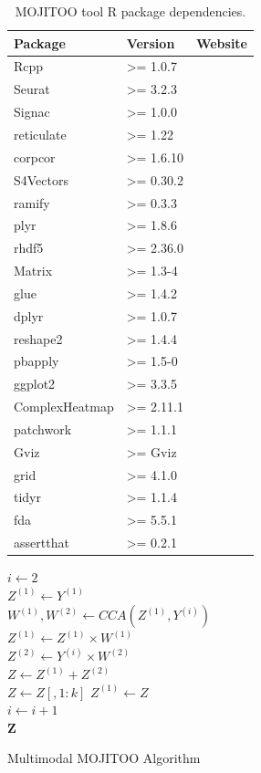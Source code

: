 \begin{table}[!ht]
	\centering
	\begin{tabular}{lll}
		\toprule
		\textbf{Package} & \textbf{Version} & \textbf{Website} \\
		\midrule
		  Rcpp  & >= 1.0.7& \url{} \\
		  Seurat & >= 3.2.3 & \url{} \\
		  Signac & >= 1.0.0& \url{} \\
		  reticulate & >= 1.22& \url{} \\
		  corpcor & >= 1.6.10 & \url{} \\
		  S4Vectors & >= 0.30.2 & \url{} \\
		  ramify & >= 0.3.3 & \url{} \\
		  plyr & >= 1.8.6 & \url{} \\
		  rhdf5 & >= 2.36.0 & \url{} \\
		  Matrix & >= 1.3-4 & \url{} \\
		  glue & >= 1.4.2 & \url{} \\
		  dplyr & >= 1.0.7 & \url{} \\
		  reshape2 & >= 1.4.4 & \url{} \\
		  pbapply & >= 1.5-0 & \url{} \\
		  ggplot2 & >= 3.3.5 & \url{} \\
		  ComplexHeatmap & >= 2.11.1 & \url{} \\
		  patchwork & >= 1.1.1 & \url{} \\
		  Gviz & >= Gviz & \url{} \\
		  grid & >= 4.1.0 & \url{} \\
		  tidyr & >= 1.1.4 & \url{} \\
		  fda & >= 5.5.1 & \url{} \\
		  assertthat & >= 0.2.1 & \url{} \\
		\bottomrule
	\end{tabular}
	\vspace{0.1cm}
	\caption[MOJITOO tool R package dependencies]{MOJITOO tool R package dependencies.}
	\label{tab:mojitoo_R_dependencies}
\end{table}


\begin{algorithm}

	$i \gets 2$ \\
	$Z^{(1)} \gets Y^{(1)}$ \\
	{
		$W^{(1)}, W^{(2)} \gets CCA(Z^{(1)}, Y^{(i)})$ \\ 
		$Z^{(1)} \gets Z^{(1)}\times W^{(1)}$ \\ 
		$Z^{(2)} \gets Y^{(i)}\times W^{(2)}$  \\
		$Z \gets Z^{(1)} + Z^{(2)}$ \\ 
		$Z \gets Z[, 1:k]$ 
		$Z^{(1)} \gets Z$ \\
		$i \gets i+1$  \\
	}
	\Return $\mathbf{Z}$ 
	\caption{Multimodal MOJITOO Algorithm }
	\label{alg:MOJITOO}
\end{algorithm}

